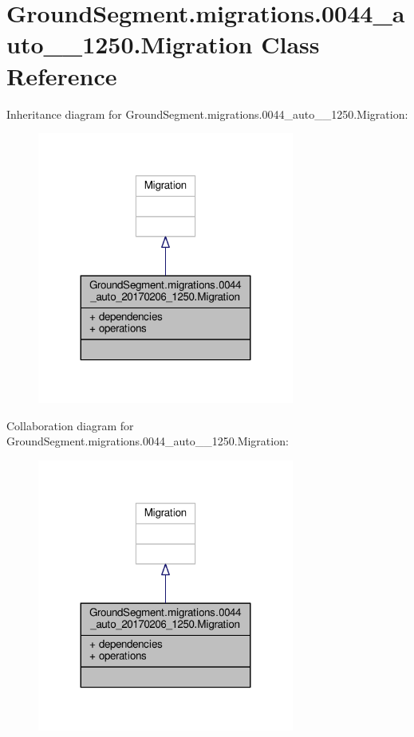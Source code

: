 \hypertarget{class_ground_segment_1_1migrations_1_10044__auto__20170206__1250_1_1_migration}{}\section{Ground\+Segment.\+migrations.0044\+\_\+auto\+\_\+\_\+1250.Migration Class Reference}
\label{class_ground_segment_1_1migrations_1_10044__auto__20170206__1250_1_1_migration}


Inheritance diagram for Ground\+Segment.\+migrations.0044\+\_\+auto\+\_\+\_\+1250.Migration\+:\nopagebreak
\begin{figure}[H]
\begin{center}
\leavevmode
\includegraphics[width=239pt]{class_ground_segment_1_1migrations_1_10044__auto__20170206__1250_1_1_migration__inherit__graph}
\end{center}
\end{figure}


Collaboration diagram for Ground\+Segment.\+migrations.0044\+\_\+auto\+\_\+\_\+1250.Migration\+:\nopagebreak
\begin{figure}[H]
\begin{center}
\leavevmode
\includegraphics[width=239pt]{class_ground_segment_1_1migrations_1_10044__auto__20170206__1250_1_1_migration__coll__graph}
\end{center}
\end{figure}
